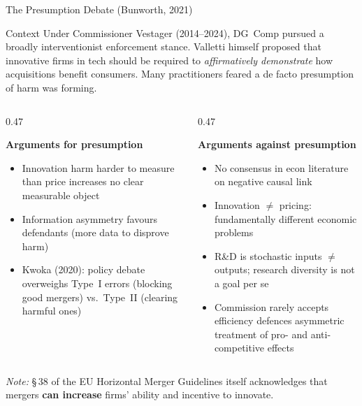 \documentclass[10pt, aspectratio=169]{beamer}
\newcommand{\pos}[1]{\textcolor{softgreen}{#1}}
\newcommand{\negg}[1]{\textcolor{softred}{#1}}
\begin{document}
\begin{frame}{The Presumption Debate (Bunworth, 2021)}
\small

\begin{block}{Context}
Under Commissioner Vestager (2014--2024), DG~Comp pursued a broadly interventionist enforcement stance. Valletti himself proposed that innovative firms in tech should be required to \textit{affirmatively demonstrate} how acquisitions benefit consumers. Many practitioners feared a de facto presumption of harm was forming.
\end{block}

\vspace{0.3em}
\begin{columns}[T,onlytextwidth]
\begin{column}{0.47\textwidth}

\textbf{\negg{Arguments for presumption}}
\begin{itemize}
    \setlength{\itemsep}{0.3em}
    \item Innovation harm harder to measure than price increases no clear measurable object
    \item Information asymmetry favours defendants (more data to disprove harm)
    \item Kwoka (2020): policy debate overweighs Type~I errors (blocking good mergers) vs.\ Type~II (clearing harmful ones)
\end{itemize}

\end{column}
\begin{column}{0.47\textwidth}

\textbf{\pos{Arguments against presumption}}
\begin{itemize}
    \setlength{\itemsep}{0.3em}
    \item No consensus in econ literature on negative causal link
    \item Innovation $\neq$ pricing: fundamentally different economic problems
    \item R\&D is stochastic inputs $\neq$ outputs; research diversity is not a goal per se
    \item Commission rarely accepts efficiency defences asymmetric treatment of pro- and anti-competitive effects
\end{itemize}

\end{column}
\end{columns}

\vspace{0.3em}
{\footnotesize \textit{Note:} \S\,38 of the EU Horizontal Merger Guidelines itself acknowledges that mergers \textbf{can increase} firms' ability and incentive to innovate.}
\end{frame}
\end{document}
